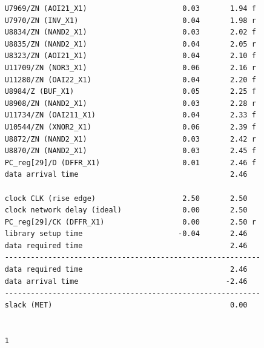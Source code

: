 \begin{lstlisting}
	U7969/ZN (AOI21_X1)                      0.03       1.94 f
	U7970/ZN (INV_X1)                        0.04       1.98 r
	U8834/ZN (NAND2_X1)                      0.03       2.02 f
	U8835/ZN (NAND2_X1)                      0.04       2.05 r
	U8323/ZN (AOI21_X1)                      0.04       2.10 f
	U11709/ZN (NOR3_X1)                      0.06       2.16 r
	U11280/ZN (OAI22_X1)                     0.04       2.20 f
	U8984/Z (BUF_X1)                         0.05       2.25 f
	U8908/ZN (NAND2_X1)                      0.03       2.28 r
	U11734/ZN (OAI211_X1)                    0.04       2.33 f
	U10544/ZN (XNOR2_X1)                     0.06       2.39 f
	U8872/ZN (NAND2_X1)                      0.03       2.42 r
	U8870/ZN (NAND2_X1)                      0.03       2.45 f
	PC_reg[29]/D (DFFR_X1)                   0.01       2.46 f
	data arrival time                                   2.46
	
	clock CLK (rise edge)                    2.50       2.50
	clock network delay (ideal)              0.00       2.50
	PC_reg[29]/CK (DFFR_X1)                  0.00       2.50 r
	library setup time                      -0.04       2.46
	data required time                                  2.46
	-----------------------------------------------------------
	data required time                                  2.46
	data arrival time                                  -2.46
	-----------------------------------------------------------
	slack (MET)                                         0.00
	
	
	1
\end{lstlisting}

\newappendix\label{ap4}
